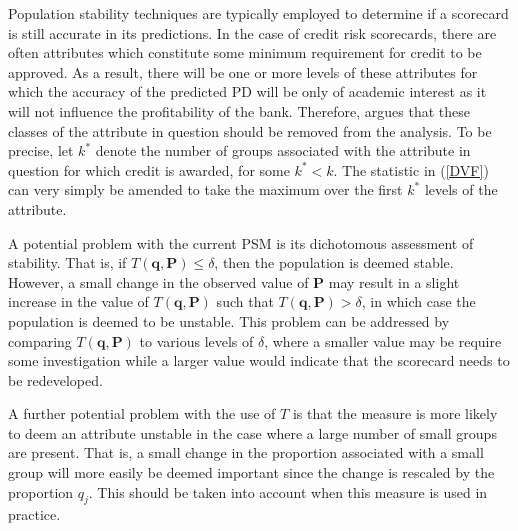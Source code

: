 \documentclass{article}
\theoremstyle{def}
\begin{document}
Population stability techniques are typically employed to determine if a scorecard is still accurate in its predictions. In the case of credit risk scorecards, there are often attributes which constitute some minimum requirement for credit to be approved. As a result, there will be one or more levels of these attributes for which the accuracy of the predicted PD will be only of academic interest as it will not influence the profitability of the bank. Therefore, \cite{DUPISANIEVISAGIE2020} argues that these classes of the attribute in question should be removed from the analysis. To be precise, let $k^*$ denote the number of groups associated with the attribute in question for which credit is awarded, for some $k^*<k$. The statistic in (\ref{DVF}) can very simply be amended to take the maximum over the first $k^*$ levels of the attribute.


A potential problem with the current PSM is its dichotomous assessment of stability. That is, if $T(\mathbf{q},\mathbf{P}) \leq \delta$, then the population is deemed stable. However, a small change in the observed value of $\mathbf{P}$ may result in a slight increase in the value of $T(\mathbf{q},\mathbf{P})$ such that $T(\mathbf{q},\mathbf{P}) > \delta$, in which case the population is deemed to be unstable. This problem can be addressed by comparing $T(\mathbf{q},\mathbf{P})$ to various levels of $\delta$, where a smaller value may be require some investigation while a larger value would indicate that the scorecard needs to be redeveloped.

A further potential problem with the use of $T$ is that the measure is more likely to deem an attribute unstable in the case where a large number of small groups are present. That is, a small change in the proportion associated with a small group will more easily be deemed important since the change is rescaled by the proportion $q_j$. This should be taken into account when this measure is used in practice.

\end{document}
